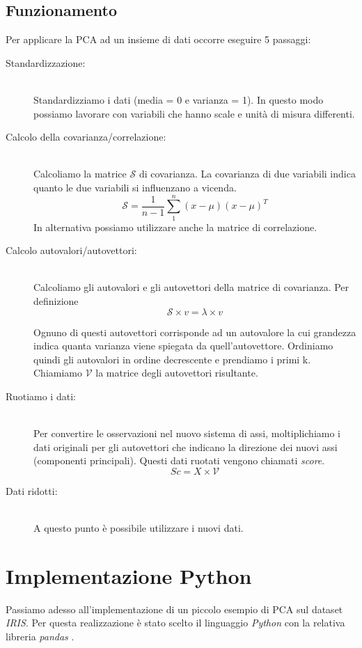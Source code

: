 \documentclass[12pt]{article}
\newcommand{\sectionline}{
	\begin{center}
		\resizebox{0.5\linewidth}{1ex}{
			\begin{tikzpicture}
			\node  (C) at (0,0) {};
			\node (D) at (9,0) {};
			\path (C) to [ornament=83] (D);
			\end{tikzpicture}
		}
	\end{center}
}
\begin{document}
	\subsection{Funzionamento}
		Per applicare la \ac{PCA} ad un insieme di dati occorre eseguire 5 passaggi:	
		\begin{description}
			\item[Standardizzazione:] \hfill \\
			 Standardizziamo i dati (media = 0 e varianza = 1). In questo modo possiamo lavorare con variabili che hanno scale e unità di misura differenti.
			\item[Calcolo della covarianza/correlazione:] \hfill \\
			Calcoliamo la matrice $\mathcal{S}$ di covarianza. La covarianza di due variabili indica quanto le due variabili si influenzano a vicenda.
			$$\mathcal{S} = \frac{1}{n-1} \sum_{1}^{n} (x-\mu)(x-\mu)^T$$
			In alternativa possiamo utilizzare anche la matrice di correlazione.
			\item[Calcolo autovalori/autovettori:] \hfill \\ 
			Calcoliamo gli autovalori e gli autovettori della matrice di covarianza. Per definizione $$\mathcal{S} \times v = \lambda \times v$$
			
			Ognuno di questi autovettori corrisponde ad un autovalore la cui grandezza indica quanta varianza viene spiegata da quell'autovettore. Ordiniamo quindi gli autovalori in ordine decrescente e prendiamo i primi k. Chiamiamo $\mathcal{V}$ la matrice degli autovettori risultante.
			\item[Ruotiamo i dati:] \hfill \\
			Per convertire le osservazioni nel nuovo sistema di assi, moltiplichiamo i dati originali per gli autovettori che indicano la direzione dei nuovi assi (componenti principali). Questi dati ruotati vengono chiamati \emph{score}. $$Sc = X \times \mathcal{V}$$
			\item[Dati ridotti:] \hfill \\
			A questo punto è possibile utilizzare i nuovi dati.
		\end{description}
	
	\sectionline
	
\section{Implementazione Python}

	Passiamo adesso all'implementazione di un piccolo esempio di \ac{PCA} sul dataset \emph{IRIS}. Per questa realizzazione è stato scelto il linguaggio \emph{Python} con la relativa libreria \emph{pandas} \cite{pandasSite}.
\end{document}
